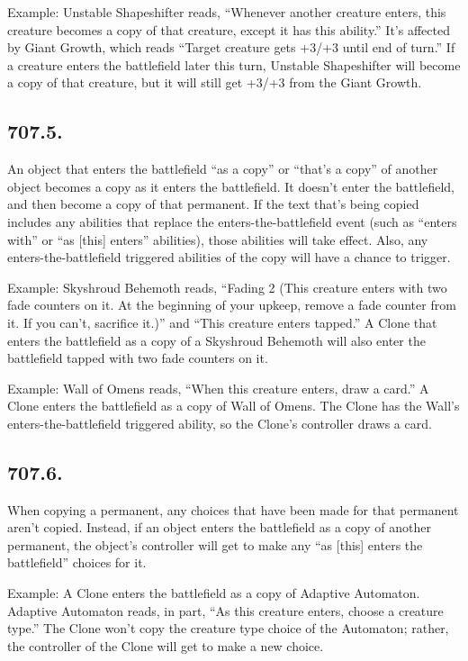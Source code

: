 Example: Unstable Shapeshifter reads, “Whenever another creature enters, this creature becomes a copy of that creature, except it has this ability.” It’s affected by Giant Growth, which reads “Target creature gets +3/+3 until end of turn.” If a creature enters the battlefield later this turn, Unstable Shapeshifter will become a copy of that creature, but it will still get +3/+3 from the Giant Growth.

\subsection*{707.5.}
An object that enters the battlefield “as a copy” or “that’s a copy” of another object becomes a copy as it enters the battlefield. It doesn’t enter the battlefield, and then become a copy of that permanent. If the text that’s being copied includes any abilities that replace the enters-the-battlefield event (such as “enters with” or “as [this] enters” abilities), those abilities will take effect. Also, any enters-the-battlefield triggered abilities of the copy will have a chance to trigger.

Example: Skyshroud Behemoth reads, “Fading 2 (This creature enters with two fade counters on it. At the beginning of your upkeep, remove a fade counter from it. If you can’t, sacrifice it.)” and “This creature enters tapped.” A Clone that enters the battlefield as a copy of a Skyshroud Behemoth will also enter the battlefield tapped with two fade counters on it.

Example: Wall of Omens reads, “When this creature enters, draw a card.” A Clone enters the battlefield as a copy of Wall of Omens. The Clone has the Wall’s enters-the-battlefield triggered ability, so the Clone’s controller draws a card.

\subsection*{707.6.}
When copying a permanent, any choices that have been made for that permanent aren’t copied. Instead, if an object enters the battlefield as a copy of another permanent, the object’s controller will get to make any “as [this] enters the battlefield” choices for it.

Example: A Clone enters the battlefield as a copy of Adaptive Automaton. Adaptive Automaton reads, in part, “As this creature enters, choose a creature type.” The Clone won’t copy the creature type choice of the Automaton; rather, the controller of the Clone will get to make a new choice.

